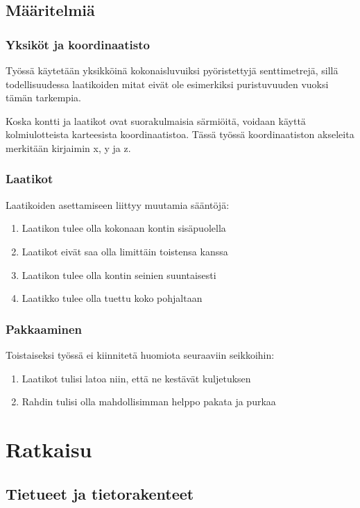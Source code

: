 \documentclass[a4paper,12pt, titlepage]{article}
\begin{document}
\subsection*{Määritelmiä}
\subsubsection*{Yksiköt ja koordinaatisto}
Työssä käytetään yksikköinä kokonaisluvuiksi pyöristettyjä senttimetrejä, sillä todellisuudessa laatikoiden mitat eivät ole esimerkiksi puristuvuuden vuoksi tämän tarkempia. \newline

\noindent
Koska kontti ja laatikot ovat suorakulmaisia särmiöitä, voidaan käyttä kolmiulotteista karteesista koordinaatistoa. Tässä työssä koordinaatiston akseleita merkitään kirjaimin x, y ja z.

\subsubsection*{Laatikot}
Laatikoiden asettamiseen liittyy muutamia sääntöjä:
\begin{enumerate}
	\item Laatikon tulee olla kokonaan kontin sisäpuolella
	\item Laatikot eivät saa olla limittäin toistensa kanssa
	\item Laatikon tulee olla kontin seinien suuntaisesti
	\item Laatikko tulee olla tuettu koko pohjaltaan
\end{enumerate}


\subsubsection*{Pakkaaminen}
Toistaiseksi työssä ei kiinnitetä huomiota seuraaviin seikkoihin:

\begin{enumerate}
	\item Laatikot tulisi latoa niin, että ne kestävät kuljetuksen
	\item Rahdin tulisi olla mahdollisimman helppo pakata ja purkaa
\end{enumerate}

\section*{Ratkaisu}
\subsection*{Tietueet ja tietorakenteet}
\end{document}
